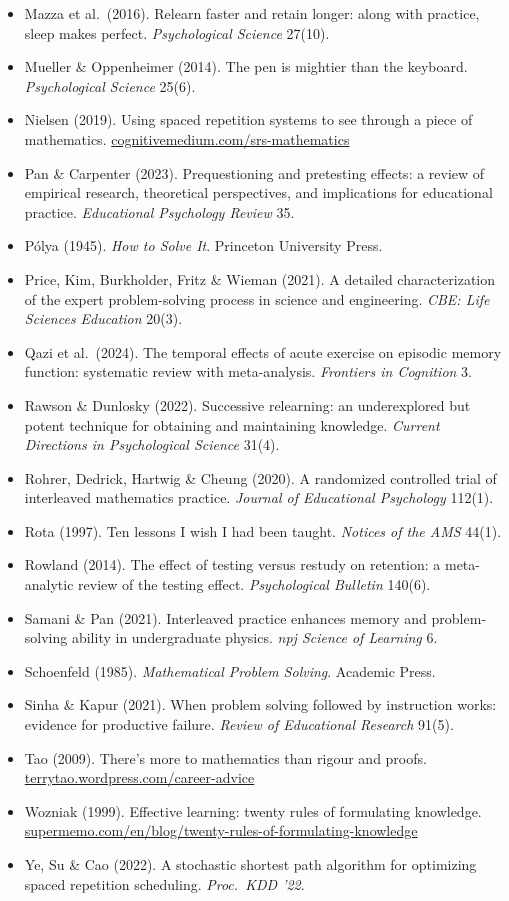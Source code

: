 \documentclass{kaelearn}
\newcommand\src[1]{\url{#1}}
\begin{document}
{\begin{itemize}
\item Mazza et al.\ (2016). Relearn faster and retain longer: along with practice, sleep makes perfect. \emph{Psychological Science} 27(10).
\item Mueller \& Oppenheimer (2014). The pen is mightier than the keyboard. \emph{Psychological Science} 25(6).
\item Nielsen (2019). Using spaced repetition systems to see through a piece of mathematics. \src{cognitivemedium.com/srs-mathematics}
\item Pan \& Carpenter (2023). Prequestioning and pretesting effects: a review of empirical research, theoretical perspectives, and implications for educational practice. \emph{Educational Psychology Review} 35.
\item Pólya (1945). \emph{How to Solve It}. Princeton University Press.
\item Price, Kim, Burkholder, Fritz \& Wieman (2021). A detailed characterization of the expert problem-solving process in science and engineering. \emph{CBE: Life Sciences Education} 20(3).
\item Qazi et al.\ (2024). The temporal effects of acute exercise on episodic memory function: systematic review with meta-analysis. \emph{Frontiers in Cognition} 3.
\item Rawson \& Dunlosky (2022). Successive relearning: an underexplored but potent technique for obtaining and maintaining knowledge. \emph{Current Directions in Psychological Science} 31(4).
\item Rohrer, Dedrick, Hartwig \& Cheung (2020). A randomized controlled trial of interleaved mathematics practice. \emph{Journal of Educational Psychology} 112(1).
\item Rota (1997). Ten lessons I wish I had been taught. \emph{Notices of the AMS} 44(1).
\item Rowland (2014). The effect of testing versus restudy on retention: a meta-analytic review of the testing effect. \emph{Psychological Bulletin} 140(6).
\item Samani \& Pan (2021). Interleaved practice enhances memory and problem-solving ability in undergraduate physics. \emph{npj Science of Learning} 6.
\item Schoenfeld (1985). \emph{Mathematical Problem Solving}. Academic Press.
\item Sinha \& Kapur (2021). When problem solving followed by instruction works: evidence for productive failure. \emph{Review of Educational Research} 91(5).
\item Tao (2009). There's more to mathematics than rigour and proofs. \src{terrytao.wordpress.com/career-advice}
\item Wozniak (1999). Effective learning: twenty rules of formulating knowledge. \src{supermemo.com/en/blog/twenty-rules-of-formulating-knowledge}
\item Ye, Su \& Cao (2022). A stochastic shortest path algorithm for optimizing spaced repetition scheduling. \emph{Proc.\ KDD '22}.
\end{itemize}}
\end{document}
